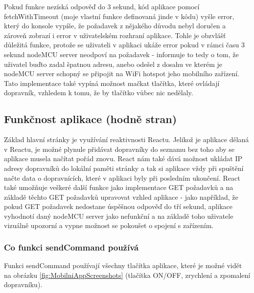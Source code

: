 Pokud funkce nezíská odpověď do 3 sekund, kód aplikace pomocí fetchWithTimeout (moje vlastní funkce definovaná jinde v kódu) vyšle error, který do konsole vypíše, že požadavek z nějakého důvodu nebyl doručen a zároveň zobrazí i error v uživatelském rozhraní aplikace. Tohle je obzvlášť důležitá funkce, protože se uživateli v aplikaci ukáže error pokud v rámci času 3 sekund nodeMCU server neodpoví na požadavek - informuje to tedy o tom, že uživatel buďto zadal špatnou adresu, anebo odešel z dosahu ve kterém je nodeMCU server schopný se připojit na WiFi hotspot jeho mobilního zařízení. Tato implementace také vypíná možnost mačkat tlačítka, které ovládají dopravník, vzhledem k tomu, že by tlačítko vůbec nic nedělaly.

\subsection{Funkčnost aplikace (hodně stran)}

Základ hlavní stránky je využívání reaktivnosti Reactu. Jelikož je aplikace dělaná v Reactu, je možné plynule přidávat dopravníky do seznamu bez toho aby se aplikace musela načítat pořád znovu. React nám také dává možnost ukládat IP adresy dopravníků do lokální paměti stránky a tak si aplikace vždy při spuštění načte data o dopravnících, které v aplikaci byly při posledním ukončení. React také umožňuje veškeré další funkce jako implementace GET požadavků a na základě těchto GET požadavků upravovat vzhled aplikace - jako například, že pokud GET požadavek nedostane úspěšnou odpověď do tří sekund, aplikace vyhodnotí daný nodeMCU server jako nefunkční a na základě toho uživatele vizuálně upozorní a vypne možnost se pokoušet o spojení s zařízením.

\subsubsection{Co funkci sendCommand používá}

Funkci sendCommand používají všechny tlačítka aplikace, které je možné vidět na obrázku \ref{fig:MobilniAppScreenshots} (tlačítka ON/OFF, zrychlení a zpomalení dopravníku).

